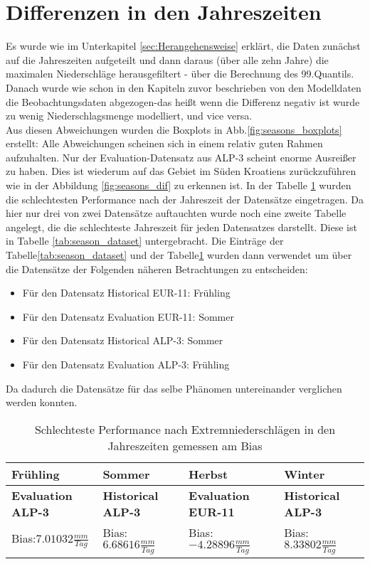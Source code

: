\section{Differenzen in den Jahreszeiten}
Es wurde wie im Unterkapitel \ref{sec:Herangehensweise} erklärt, die Daten zunächst auf die Jahreszeiten aufgeteilt und dann daraus (über alle zehn Jahre) die maximalen Niederschläge herausgefiltert - über die Berechnung des 99.Quantils. Danach wurde wie schon in den Kapiteln zuvor beschrieben von den Modelldaten die Beobachtungsdaten abgezogen-das heißt wenn die Differenz negativ ist wurde zu wenig Niederschlagsmenge modelliert, und vice versa.\\
Aus diesen Abweichungen wurden die Boxplots in Abb.\ref{fig:seasons_boxplots} erstellt: Alle Abweichungen scheinen sich in einem relativ guten Rahmen aufzuhalten. Nur der Evaluation-Datensatz aus ALP-3 scheint enorme Ausreißer zu haben. Dies ist wiederum auf das Gebiet im Süden Kroatiens zurückzuführen wie in der Abbildung \ref{fig:seasons_dif} zu erkennen ist. In der Tabelle \ref{tab:season_bias} wurden die schlechtesten Performance nach der Jahreszeit der Datensätze eingetragen. Da hier nur drei von zwei Datensätze auftauchten wurde noch eine zweite Tabelle angelegt, die die schlechteste Jahreszeit für jeden Datensatzes darstellt. Diese ist in Tabelle \ref{tab:season_dataset} untergebracht. Die Einträge der Tabelle\ref{tab:season_dataset} und der Tabelle\ref{tab:season_bias} wurden dann verwendet um über die Datensätze der Folgenden näheren Betrachtungen zu entscheiden:
\begin{itemize}
	\item Für den Datensatz Historical EUR-11: Frühling
	\item Für den Datensatz Evaluation EUR-11: Sommer
	\item Für den Datensatz Historical ALP-3: Sommer
	\item Für den Datensatz Evaluation ALP-3: Frühling
\end{itemize}
Da dadurch die Datensätze für das selbe Phänomen untereinander verglichen werden konnten. 
\begin{table}[h]
	\begin{tabularx}{\textwidth}{|X|X|X|X|}
		\hline
		\textbf{Frühling} & \textbf{Sommer}& \textbf{Herbst} & \textbf{Winter}\\
		\hline
		\textbf{Evaluation ALP-3}  & \textbf{Historical ALP-3}  & \textbf{Evaluation EUR-11} & \textbf{Historical ALP-3} \\
		Bias:$7.01032\frac{mm}{Tag}$& Bias:$6.68616\frac{mm}{Tag}$ & Bias: $-4.28896\frac{mm}{Tag}$ & Bias:$8.33802\frac{mm}{Tag}$\\
		\hline
	\end{tabularx}
	\caption{Schlechteste Performance nach Extremniederschlägen in den Jahreszeiten gemessen am Bias}
	\label{tab:season_bias}
\end{table}
